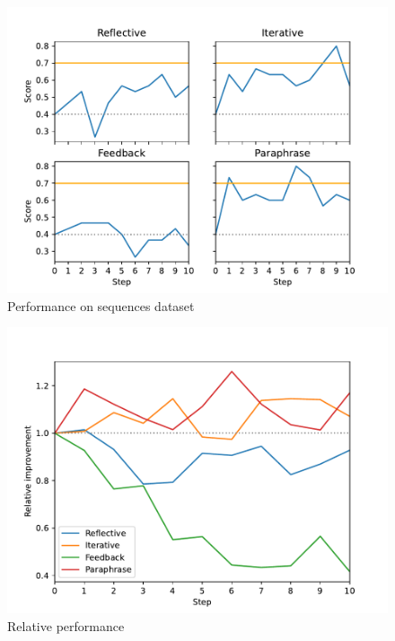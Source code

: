 \begin{figure}
    \label{fig:sequences}
    \includegraphics[width=\linewidth]{sequences.pdf}
    \caption{Performance on sequences dataset}
\end{figure}


\begin{figure}
    \label{fig:relative}
    \includegraphics[width=\linewidth]{relative.pdf}
    \caption{Relative performance}
\end{figure}

